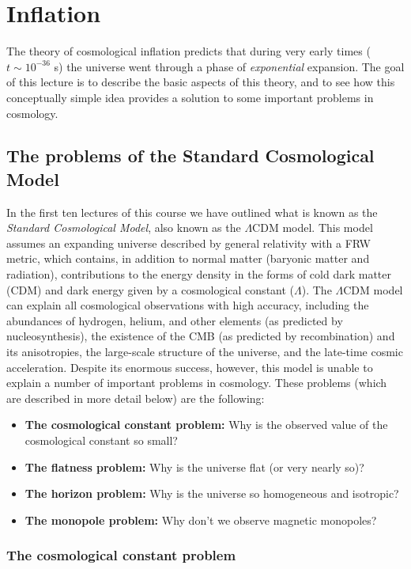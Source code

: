 \chapter{Inflation}

The theory of cosmological inflation predicts that during very early times ($t\sim 10^{-36}$ s) the universe went through a phase of {\it exponential} expansion. The goal of this lecture is to describe the basic aspects of this theory, and to see how this conceptually simple idea provides a solution to some important problems in cosmology.

\section{The problems of the Standard Cosmological Model}

In the first ten lectures of this course we have outlined what is known as the {\it Standard Cosmological Model}, also known as the $\Lambda$CDM model. This model assumes an expanding universe described by general relativity with a FRW metric, which contains, in addition to normal matter (baryonic matter and radiation), contributions to the energy density in the forms of cold dark matter (CDM) and dark energy given by a cosmological constant ($\Lambda$). The $\Lambda$CDM model can explain all cosmological observations with high accuracy, including the abundances of hydrogen, helium, and other elements (as predicted by nucleosynthesis), the existence of the CMB (as predicted by recombination) and its anisotropies, the large-scale structure of the universe, and the late-time cosmic acceleration. Despite its enormous success, however, this model is unable to explain a number of important problems in cosmology. These problems (which are described in more detail below) are the following:
\begin{itemize}
\item {\bf The cosmological constant problem:} Why is the observed value of the cosmological constant so small?
\item {\bf The flatness problem:} Why is the universe flat (or very nearly so)?
\item {\bf The horizon problem:} Why is the universe so homogeneous and isotropic?
\item {\bf The monopole problem:} Why don't we observe magnetic monopoles?
\end{itemize}

\subsection{The cosmological constant problem}

